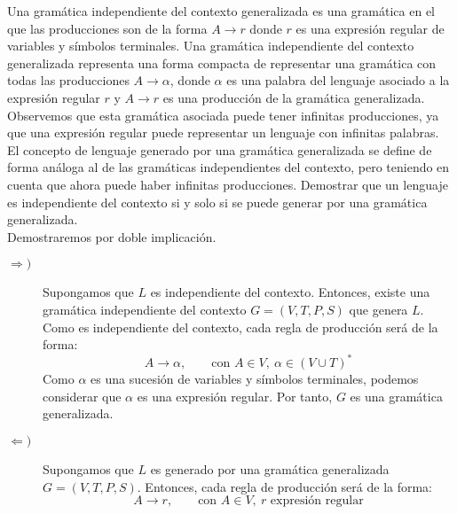 \begin{ejercicio}\label{ej:1.4.15}
    Una gramática independiente del contexto generalizada es una gramática en el que las producciones son de la forma $A \rightarrow r$ donde $r$ es una expresión regular de variables y símbolos terminales. Una gramática independiente del contexto generalizada representa una forma compacta de representar una gramática con todas las producciones $A \rightarrow \alpha$, donde $\alpha$ es una palabra del lenguaje asociado a la expresión regular $r$ y $A \rightarrow r$ es una producción de la gramática generalizada. Observemos que esta gramática asociada puede tener infinitas producciones, ya que una expresión regular puede representar un lenguaje con infinitas palabras. El concepto de lenguaje generado por una gramática generalizada se define de forma análoga al de las gramáticas independientes del contexto, pero teniendo en cuenta que ahora puede haber infinitas producciones. Demostrar que un lenguaje es independiente del contexto si y solo si se puede generar por una gramática generalizada.\\

    Demostraremos por doble implicación.
    \begin{description}
        \item[$\Longrightarrow)$] Supongamos que $L$ es independiente del contexto. Entonces, existe una gramática independiente del contexto $G=(V,T,P,S)$ que genera $L$. Como es independiente del contexto, cada regla de producción será de la forma:
        \begin{equation*}
            A\to \alpha,\qquad \text{con } A\in V,~\alpha\in (V\cup T)^*
        \end{equation*}
        Como $\alpha$ es una sucesión de variables y símbolos terminales, podemos considerar que $\alpha$ es una expresión regular. Por tanto, $G$ es una gramática generalizada.\\

        \item[$\Longleftarrow)$] Supongamos que $L$ es generado por una gramática generalizada $G=(V,T,P,S)$. Entonces, cada regla de producción será de la forma:
        \begin{equation*}
            A\to r,\qquad \text{con } A\in V,~r \text{ expresión regular}
        \end{equation*}


\end{description}
\end{ejercicio}

